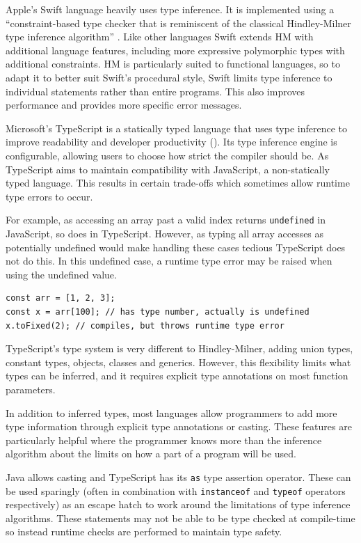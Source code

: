 \documentclass[a4paper,fleqn,oneside,12pt]{report}
\begin{document}
Apple's Swift language heavily uses type inference. It is implemented using a ``constraint-based type checker that is reminiscent of the classical Hindley-Milner type inference algorithm'' \citep{ref24}. Like other languages Swift extends HM with additional language features, including more expressive polymorphic types with additional constraints. HM is particularly suited to functional languages, so to adapt it to better suit Swift's procedural style, Swift limits type inference to individual statements rather than entire programs. This also improves performance and provides more specific error messages.

Microsoft's TypeScript is a statically typed language that uses type inference to improve readability and developer productivity (\cite{ref36}). Its type inference engine is configurable, allowing users to choose how strict the compiler should be. As TypeScript aims to maintain compatibility with JavaScript, a non-statically typed language. This results in certain trade-offs which sometimes allow runtime type errors to occur.

For example, as accessing an array past a valid index returns \texttt{undefined} in JavaScript, so does in TypeScript. However, as typing all array accesses as potentially undefined would make handling these cases tedious TypeScript does not do this. In this undefined case, a runtime type error may be raised when using the undefined value.

\begin{verbatim}
const arr = [1, 2, 3];
const x = arr[100]; // has type number, actually is undefined
x.toFixed(2); // compiles, but throws runtime type error
\end{verbatim}

TypeScript's type system is very different to Hindley-Milner, adding union types, constant types, objects, classes and generics. However, this flexibility limits what types can be inferred, and it requires explicit type annotations on most function parameters.

In addition to inferred types, most languages allow programmers to add more type information through explicit type annotations or casting. These features are particularly helpful where the programmer knows more than the inference algorithm about the limits on how a part of a program will be used.

Java allows casting and TypeScript has its \texttt{as} type assertion operator. These can be used sparingly (often in combination with \texttt{instanceof} and \texttt{typeof} operators respectively) as an escape hatch to work around the limitations of type inference algorithms. These statements may not be able to be type checked at compile-time so instead runtime checks are performed to maintain type safety.
\end{document}

